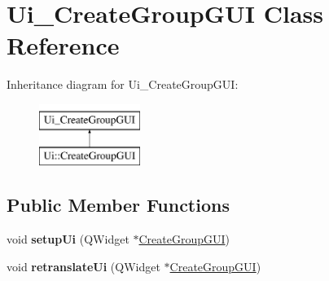 \hypertarget{classUi__CreateGroupGUI}{}\section{Ui\+\_\+\+Create\+Group\+G\+UI Class Reference}
\label{classUi__CreateGroupGUI}
Inheritance diagram for Ui\+\_\+\+Create\+Group\+G\+UI\+:\begin{figure}[H]
\begin{center}
\leavevmode
\includegraphics[height=2.000000cm]{classUi__CreateGroupGUI}
\end{center}
\end{figure}
\subsection*{Public Member Functions}
\begin{DoxyCompactItemize}
\item 
void {\bfseries setup\+Ui} (Q\+Widget $\ast$\hyperlink{classCreateGroupGUI}{Create\+Group\+G\+UI})\hypertarget{classUi__CreateGroupGUI_a2b7c59455b2c74d735b215098bb46d30}{}\label{classUi__CreateGroupGUI_a2b7c59455b2c74d735b215098bb46d30}

\item 
void {\bfseries retranslate\+Ui} (Q\+Widget $\ast$\hyperlink{classCreateGroupGUI}{Create\+Group\+G\+UI})\hypertarget{classUi__CreateGroupGUI_aa7d362d6c6219e78914904d63dea2847}{}\label{classUi__CreateGroupGUI_aa7d362d6c6219e78914904d63dea2847}

\end{DoxyCompactItemize}
